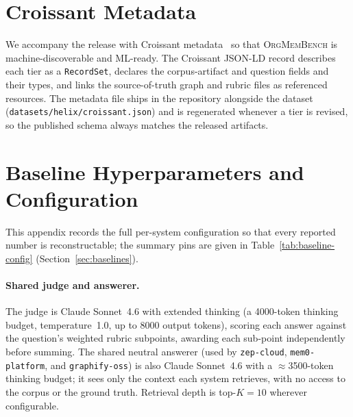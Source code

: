 \documentclass[11pt]{article}
\newcommand{\bench}{\textsc{OrgMemBench}\xspace}
\begin{document}


\section{Croissant Metadata}
\label{app:croissant}
We accompany the release with Croissant metadata~\citep{croissant2024} so that
\bench{} is machine-discoverable and ML-ready. The Croissant JSON-LD record
describes each tier as a \texttt{RecordSet}, declares the corpus-artifact and
question fields and their types, and links the source-of-truth graph and rubric
files as referenced resources. The metadata file ships in the repository
alongside the dataset (\texttt{datasets/helix/croissant.json}) and is regenerated
whenever a tier is revised, so the published schema always matches the released
artifacts.

\section{Baseline Hyperparameters and Configuration}
\label{app:hyperparams}
This appendix records the full per-system configuration so that every reported
number is reconstructable; the summary pins are given in
Table~\ref{tab:baseline-config} (Section~\ref{sec:baselines}).

\paragraph{Shared judge and answerer.}
The judge is Claude Sonnet~4.6 with extended thinking (a 4000-token thinking
budget, temperature~1.0, up to 8000 output tokens), scoring each answer against
the question's weighted rubric subpoints, awarding each sub-point independently
before summing. The shared neutral answerer (used by \texttt{zep-cloud},
\texttt{mem0-platform}, and \texttt{graphify-oss}) is also Claude Sonnet~4.6 with
a $\approx$3500-token thinking budget; it sees only the context each system
retrieves, with no access to the corpus or the ground truth. Retrieval depth is
top-$K=10$ wherever configurable.
\end{document}
